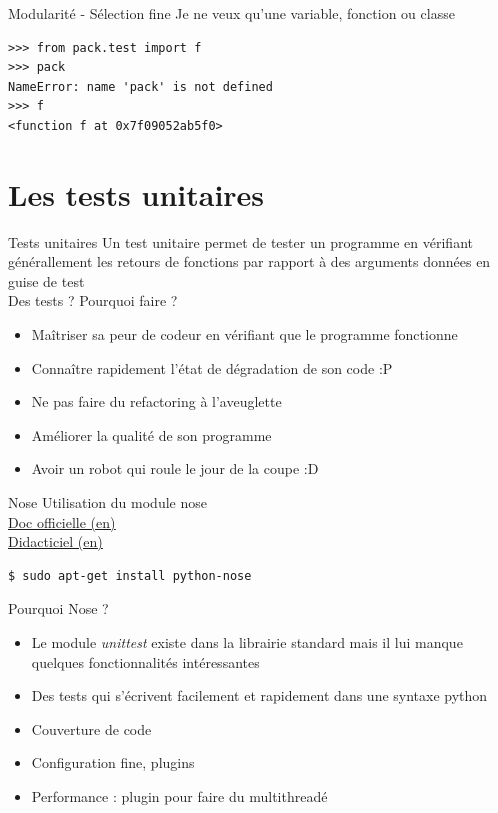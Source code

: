 \documentclass{beamer}
\begin{document}
\begin{frame}[fragile]{Modularité - Sélection fine}
Je ne veux qu'une variable, fonction ou classe
\begin{lstlisting}
>>> from pack.test import f
>>> pack
NameError: name 'pack' is not defined
>>> f
<function f at 0x7f09052ab5f0>
\end{lstlisting}
\end{frame}



\section{Les tests unitaires}

\begin{frame}[fragile]{Tests unitaires}
Un test unitaire permet de tester un programme en vérifiant générallement les retours de fonctions par rapport à des arguments données en guise de test\\
Des tests ? Pourquoi faire ?
\begin{itemize}
 \item Maîtriser sa peur de codeur en vérifiant que le programme fonctionne
 \item Connaître rapidement l'état de dégradation de son code :P
 \item Ne pas faire du refactoring à l'aveuglette
 \item Améliorer la qualité de son programme
 \item Avoir un robot qui roule le jour de la coupe :D
\end{itemize}
\end{frame}

\begin{frame}[fragile]{Nose}
Utilisation du module nose\\
\underline{\href{http://readthedocs.org/docs/nose/en/latest/}{Doc officielle (en)}}\\
\underline{\href{http://ivory.idyll.org/articles/nose-intro.html}{Didacticiel (en)}}
\begin{lstlisting}[language=bash]
$ sudo apt-get install python-nose
\end{lstlisting}
Pourquoi Nose ?
\begin{itemize}
 \item Le module \textit{unittest} existe dans la librairie standard mais il lui manque quelques fonctionnalités intéressantes
 \item Des tests qui s'écrivent facilement et rapidement dans une syntaxe python
 \item Couverture de code
 \item Configuration fine, plugins
 \item Performance : plugin pour faire du multithreadé
\end{itemize}
\end{frame}
\end{document}
